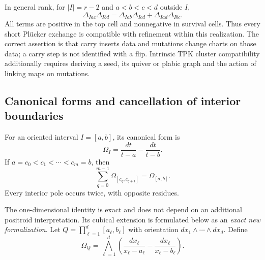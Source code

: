 In general rank, for \(|I|=r-2\) and \(a<b<c<d\) outside \(I\),
\begin{equation}
 \Delta_{Iac}\Delta_{Ibd}
 =\Delta_{Iab}\Delta_{Icd}+\Delta_{Iad}\Delta_{Ibc}.
 \label{geometria_positiva:eq:short-plucker-tpk}
\end{equation}
All terms are positive in the top cell and nonnegative in survival cells. Thus every short Plücker exchange is compatible with refinement within this realization. The correct assertion is that carry inserts data and mutations change charts on those data; a carry step is not identified with a flip. Intrinsic TPK cluster compatibility additionally requires deriving a seed, its quiver or plabic graph and the action of linking maps on mutations.

\subsection{Canonical forms and cancellation of interior boundaries}

For an oriented interval \(I=[a,b]\), its canonical form is
\begin{equation}
 \Omega_I=\frac{dt}{t-a}-\frac{dt}{t-b}.
 \label{geometria_positiva:eq:interval-canonical-form}
\end{equation}
If \(a=c_0<c_1<\cdots<c_m=b\), then
\begin{equation}
 \sum_{q=0}^{m-1}\Omega_{[c_q,c_{q+1}]}=\Omega_{[a,b]}.
 \label{geometria_positiva:eq:interval-telescopy}
\end{equation}
Every interior pole occurs twice, with opposite residues.

The one-dimensional identity is exact and does not depend on an additional positroid interpretation. Its cubical extension is formulated below as an \emph{exact new formalization}. Let \(Q=\prod_{\ell=1}^d[a_\ell,b_\ell]\) with orientation \(dx_1\wedge\cdots\wedge dx_d\). Define
\begin{equation}
 \Omega_Q=\bigwedge_{\ell=1}^d
 \left(\frac{dx_\ell}{x_\ell-a_\ell}
       -\frac{dx_\ell}{x_\ell-b_\ell}\right).
 \label{geometria_positiva:eq:box-canonical-form}
\end{equation}

